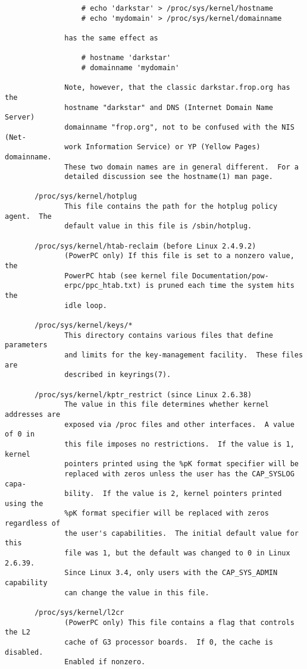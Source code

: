 \documentclass[]{article}
\begin{document}
\begin{verbatim}
                  # echo 'darkstar' > /proc/sys/kernel/hostname
                  # echo 'mydomain' > /proc/sys/kernel/domainname

              has the same effect as

                  # hostname 'darkstar'
                  # domainname 'mydomain'

              Note, however, that the classic darkstar.frop.org has the
              hostname "darkstar" and DNS (Internet Domain Name Server)
              domainname "frop.org", not to be confused with the NIS (Net‐
              work Information Service) or YP (Yellow Pages) domainname.
              These two domain names are in general different.  For a
              detailed discussion see the hostname(1) man page.

       /proc/sys/kernel/hotplug
              This file contains the path for the hotplug policy agent.  The
              default value in this file is /sbin/hotplug.

       /proc/sys/kernel/htab-reclaim (before Linux 2.4.9.2)
              (PowerPC only) If this file is set to a nonzero value, the
              PowerPC htab (see kernel file Documentation/pow‐
              erpc/ppc_htab.txt) is pruned each time the system hits the
              idle loop.

       /proc/sys/kernel/keys/*
              This directory contains various files that define parameters
              and limits for the key-management facility.  These files are
              described in keyrings(7).

       /proc/sys/kernel/kptr_restrict (since Linux 2.6.38)
              The value in this file determines whether kernel addresses are
              exposed via /proc files and other interfaces.  A value of 0 in
              this file imposes no restrictions.  If the value is 1, kernel
              pointers printed using the %pK format specifier will be
              replaced with zeros unless the user has the CAP_SYSLOG capa‐
              bility.  If the value is 2, kernel pointers printed using the
              %pK format specifier will be replaced with zeros regardless of
              the user's capabilities.  The initial default value for this
              file was 1, but the default was changed to 0 in Linux 2.6.39.
              Since Linux 3.4, only users with the CAP_SYS_ADMIN capability
              can change the value in this file.

       /proc/sys/kernel/l2cr
              (PowerPC only) This file contains a flag that controls the L2
              cache of G3 processor boards.  If 0, the cache is disabled.
              Enabled if nonzero.


\end{verbatim}
\end{document}
